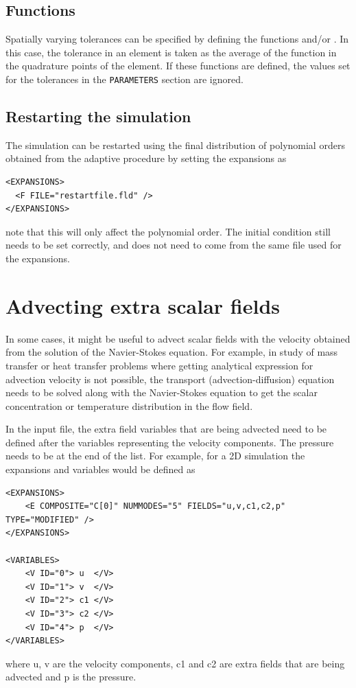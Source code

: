 \subsection{Functions}

Spatially varying tolerances can be specified by defining the
functions  and/or
. In this case, the tolerance in an
element is taken as the average of the function in the quadrature
points of the element. If these functions are defined, the values set
for the tolerances in the \texttt{PARAMETERS} section are ignored.

\subsection{Restarting the simulation}

The simulation can be restarted using the final distribution of
polynomial orders obtained from the adaptive procedure by setting
the expansions as
\begin{lstlisting}[style=XMLStyle]
<EXPANSIONS>
  <F FILE="restartfile.fld" />
</EXPANSIONS>
\end{lstlisting}
note that this will only affect the polynomial order. The initial condition
still needs to be set correctly, and does not need to come from the same file
used for the expansions.

\section{Advecting extra scalar fields}

In some cases, it might be useful to advect scalar fields with the velocity obtained from the
solution of the Navier-Stokes equation. For example, in study of mass transfer or heat transfer problems
where getting analytical expression for advection velocity is not possible, the transport (advection-diffusion)
equation needs to be solved along with the Navier-Stokes equation to get the scalar concentration or
temperature distribution in the flow field.

In the input file, the extra field variables that are being advected need to be defined after the variables
representing the velocity components. The pressure needs to be at the end of the list. For example, for
a 2D simulation the expansions and variables would be defined as

\begin{lstlisting}[style=XMLStyle]
<EXPANSIONS>
    <E COMPOSITE="C[0]" NUMMODES="5" FIELDS="u,v,c1,c2,p" TYPE="MODIFIED" />
</EXPANSIONS>

<VARIABLES>
    <V ID="0"> u  </V>
    <V ID="1"> v  </V>
    <V ID="2"> c1 </V>
    <V ID="3"> c2 </V>
    <V ID="4"> p  </V>
</VARIABLES>
\end{lstlisting}
where u, v are the velocity components, c1 and c2 are extra fields that are being advected and p is the pressure.

